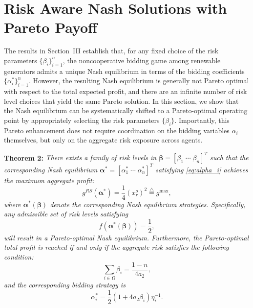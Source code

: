\documentclass[journal]{IEEEtran}
\begin{document}
\section{Risk Aware Nash Solutions with Pareto Payoff}

The results in Section~III establish that, for any fixed choice of the
risk parameters $\{\beta_i\}_{i=1}^n$, the noncooperative bidding game
among renewable generators admits a unique Nash equilibrium in terms of
the bidding coefficients $\{\alpha_i^\ast\}_{i=1}^n$.
However, the resulting Nash equilibrium is generally not Pareto optimal
with respect to the total expected profit, and there are an infinite number of risk level choices that yield the same Pareto solution. In this section, we show that the Nash equilibrium can be systematically
shifted to a Pareto-optimal operating point by appropriately selecting
the risk parameters $\{\beta_i\}$.
Importantly, this Pareto enhancement does not require coordination on
the bidding variables $\alpha_i$ themselves, but only on the aggregate
risk exposure across agents.

\noindent\textbf{Theorem 2:} {\it There exists a family of risk levels in  $\boldsymbol{\beta}=[\beta_1 \; \cdots \; \beta_n]^T$ such that the corresponding Nash equilibrium  $\boldsymbol{\alpha}^*=[\alpha_1^* \; \cdots \; \alpha_n^*]^T$ satisfying \eqref{eq:alpha_i} achieves the maximum aggregate profit:
\[
g^{RS}(\boldsymbol{\alpha}^*)  = \frac{1}{4}(x_r^o)^2 \stackrel{\triangle}{=} g^{\max},
\]
where $\boldsymbol{\alpha}^*(\boldsymbol{\beta})$ denote the corresponding Nash equilibrium strategies. 
Specifically, any admissible set of risk levels satisfying
\begin{equation}
f(\boldsymbol{\alpha}^*(\boldsymbol{\beta})) = \frac{1}{2}, \label{eq:pareto_condition}
\end{equation}
will result in a Pareto-optimal Nash equilibrium. Furthermore, the Pareto-optimal total profit is reached if and only if the aggregate risk satisfies the following condition:
\begin{equation}
\sum_{i\in\Omega} \beta_i = \frac{1-n}{4a_2},
\label{eq:beta_sum_condition}
\end{equation}
and the corresponding bidding strategy is 
\begin{equation}
    \alpha_i^* = \frac{1}{2}(1+4a_2\beta_i)\eta_i^{-1}. \label{eq:alpha_optimal}
\end{equation}}
\end{document}

